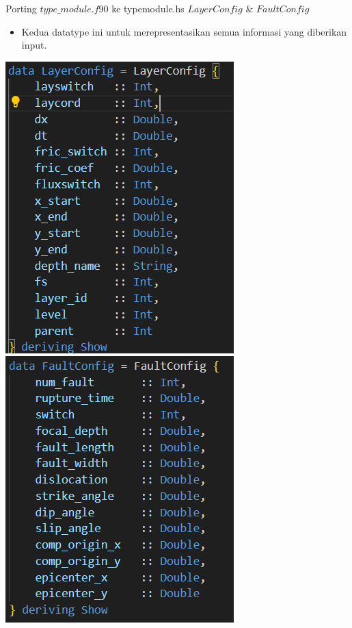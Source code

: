 \documentclass{beamer}
\begin{document}
\begin{frame}{Porting $type\_module.f90$ ke typemodule.hs}
    $LayerConfig$ \& $FaultConfig$
    \begin{itemize}
        \item Kedua datatype ini untuk merepresentasikan semua informasi yang diberikan
        input.
    \end{itemize}
    \begin{center}
        \includegraphics[scale=0.5]{figure/tmodule2.png}
        \includegraphics[scale=0.5]{figure/tmodule3.png}
    \end{center}
\end{frame}
\end{document}
